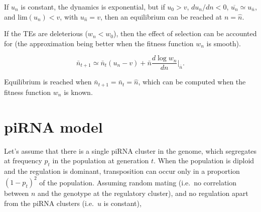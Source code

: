 \documentclass[10pt,a4paper]{article}
\begin{document}
If $u_n$ is constant, the dynamics is exponential, but if $u_0 > v$, $d u_n / d n < 0$, $\overline{u_n} \simeq u_{\bar n}$, and $\mathrm{lim} (u_n) < v$, with $u_{\hat n} = v$, then an equilibrium can be reached at $n = \hat n$. 

If the TEs are deleterious ($w_n < w_0$), then the effect of selection can be accounted for (the approximation being better when the fitness function $w_n$ is smooth). 

\begin{equation}\label{eq:cc2}
\bar n_{t+1} \simeq \bar n_t(u_n - v) + \bar n \frac{d \log w_n}{d n} \Bigr|_{\bar n}.
\end{equation}

Equilibrium is reached when $\bar n_{t+1} = \bar n_t = \hat n$, which can be computed when the fitness function $w_n$ is known. 



\section{piRNA model}

Let's assume that there is a single piRNA cluster in the genome, which segregates at frequency $p_t$ in the population at generation $t$. When the population is diploid and the regulation is dominant, transposition can occur only in a proportion $(1-p_t)^2$ of the population. Assuming random mating (i.e.\ no correlation between $n$ and the genotype at the regulatory cluster), and no regulation apart from the piRNA clusters (i.e.\ $u$ is constant),
\end{document}
